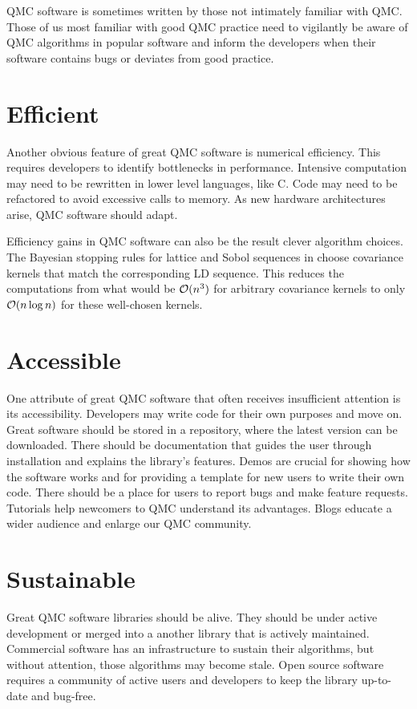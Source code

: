 \documentclass[graybox]{svmult}
\begin{document}
QMC software is sometimes written by those not intimately familiar with QMC.  Those of us most familiar with good QMC practice need to vigilantly be aware of QMC algorithms in popular software and inform the developers when their software contains bugs or deviates from good practice.

\section{Efficient} \label{CDHJS_sec:efficient}
Another obvious feature of great QMC software is numerical efficiency.  This requires developers to identify bottlenecks in performance.  Intensive computation may need to be rewritten in lower level languages, like C.  Code may need to be refactored to avoid excessive calls to memory.  As new hardware architectures arise, QMC software should adapt.

Efficiency gains in QMC software can also be the result clever algorithm choices.  The Bayesian stopping rules for lattice and Sobol sequences in \cite{RatHic19a,JagHic22a} choose covariance kernels that match the corresponding LD sequence.  This reduces the computations from what would be ${\mathcal{O}}(n^3)$ for arbitrary covariance kernels to only ${\mathcal{O}}(n \log n)$ for these well-chosen kernels.

\section{Accessible} \label{CDHJS_sec:accessible}
One attribute of great QMC software that often receives insufficient attention is its accessibility.  Developers may write code for their own purposes and move on.  Great software should be stored in a repository, where the latest version can be downloaded.  There should be documentation that guides the user through installation and explains the library's features.  Demos are crucial for showing how the software works and for providing a template for new users to write their own code.  There should be a place for users to report bugs and make feature requests.  Tutorials help newcomers to QMC understand its advantages. Blogs educate a wider audience and enlarge our QMC community.


\section{Sustainable} \label{CDHJS_sec:sustainable}
Great QMC software libraries should be alive.  They should be under active development or merged into a another library that is actively maintained.  Commercial software has an infrastructure to sustain their algorithms, but without attention, those algorithms may become stale.  Open source software requires a community of active users and developers to keep the library up-to-date and bug-free.
\end{document}

